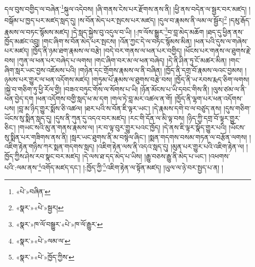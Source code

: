 དལ་བུས་བགྱིད་ལ་བཞེན་\footnote{«པེ་»བཞིན་}སྐུལ་འདེབས། །ཞི་གནས་ངེས་པར་རྫོགས་ནས་ནི། །ཕྱི་ནས་བདེན་ལ་སྦྱར་བར་མཛད། །བསྒོམ་པ་ཁྱད་པར་མཛད་སླད་དུ། །ས་བོན་མེད་པར་སྤངས་པར་མཛད། །དུལ་བ་རྣམས་ནི་ལམ་ལ་སྦྱོར།\footnote{«སྣར་»«པེ་»སྦྱར།} །དམུ་རྒོད་རྣམས་ལ་བཏང་སྙོམས་མཛད། །དེ་སླད་སྐྱེས་བུ་འདུལ་བ་ཡི། །:ཁ་ལོས་སྒྱུར་\footnote{«སྣར་»ཁ་ལོ་བསྒྱུར་«པེ་»ཁ་ལོ་རྒྱུར་}བ་བླ་མེད་མཆོག །ཐད་དུ་ཕྱིན་ནས་ཁྱོད་མཚང་འབྲུ། །གང་ཞིག་ས་བོན་མེད་པར་སྤངས། །འོན་ཀྱང་དེ་ལ་བཏང་སྙོམས་མིན། །ཕན་པའི་དུས་ལ་གཞེས་པར་མཛད། །ཁྱོད་ནི་ཉམ་ཐག་རྣམས་ལ་བརྩེ། །བདེ་བར་གནས་ལ་ཕན་པར་བགྱིད། །ཕོངས་པར་གནས་ལ་ཐུགས་རྗེ་བས། །ཀུན་ལ་ཕན་པར་བཞེད་པ་ལགས། །གང་ཞིག་བར་མ་ལ་ཕན་བཞེད། །དེ་ནི་ཤིན་ཏུ་ངོ་མཚར་མིན། །གང་ཞིག་སླར་ཡང་བྱས་འཇོམས་པའི། །གཉེན་དང་གྲོགས་རྣམས་ལ་ནི་བཞིན། །ཁྱོད་ནི་དགྲ་བོ་རྣམས་ལའང་བྱམས། །ཉམས་པར་གྱུར་ལ་ཕན་འདོགས་མཛད། །གཏུམ་པོ་རྣམས་ལ་ཐུགས་བརྩེ་བས། །ཁྱོད་ནི་ཡ་རབས་རྨད་ཅིག་ལགས། །སྐྱེ་བ་གཅིག་ཏུ་ཕྱི་རོལ་གྱི། །བཟའ་བཏུང་གོས་ལ་སོགས་པ་ཡི། །ཉོན་མོངས་པ་ཡི་དབང་གིས་ནི། །ལུས་ཙམ་ལ་ནི་ཕན་བྱེད་དག །ཕན་འདོགས་བགྱི་སླད་ཕ་མ་དག །གལ་ཏེ་བླ་མར་འཚལ་ན་གོ། །ཁྱོད་ནི་ལྷག་པར་ཕན་འདོགས་པས། །བླ་མ་ཉིད་གྱུར་སྨོས་ཅི་འཚལ། །ཐར་པའི་ས་བོན་ཇི་ལྟར་ཡང་། །དེ་རྣམས་དགེ་བ་ལ་བཙུད་ནས། །དུས་གཅིག་ཡོངས་སུ་སྨིན་སླད་དུ། །དུས་ནི་ཀུན་དུ་འདའ་བར་མཛད། །རང་གི་དོན་ལ་མི་ལྟ་བས། །ཉིད་ཀྱི་དགྲ་བོ་ལྟར་གྱུར་ཅིང་། །གཡང་སའི་མུ་ན་གནས་རྣམས་ལ། །ར་བ་ལྟ་བུར་གྱུར་པའང་ཁྱོད། །དེ་ནས་ཇི་ལྟར་སྣོད་གྱུར་པའི། །ཡོངས་སུ་སྨིན་པར་གཟིགས་ནས་ནི། །སླར་ཡང་ཐུགས་ནི་མ་བསྙེལ་ཞིང་། །སྨན་གདགས་བསམ་གཏན་ལ་བརྩོན་ལགས། །འཇིག་རྟེན་གཉིས་ཀར་སྨན་གདགས་སླད། །འཇིག་རྟེན་ལས་ནི་འདའ་སླད་དུ། །མུན་པར་གྱུར་པའི་འཇིག་རྟེན་ལ། །ཁྱོད་ཀྱིས་ཤེས་རབ་སྣང་བར་མཛད། །དེ་ལས་ཐ་དད་མེད་པ་ཡིས། །རྒྱུ་བཅས་རྒྱུ་ནི་མེད་པ་ཡང་། །འཕགས་པའི་:ལམ་ནས་\footnote{«སྣར་»«པེ་»ལམ་ལ་}འགོད་མཛད་དང་། །:ཁྱོད་ཀྱི་\footnote{«སྣར་»«པེ་»ཁྱོད་ཀྱིས་}འཇིག་རྟེན་ལ་སྟོན་མཛད། །ཡུལ་ལ་ཉེ་བར་སྤྱད་པ་ན། །
